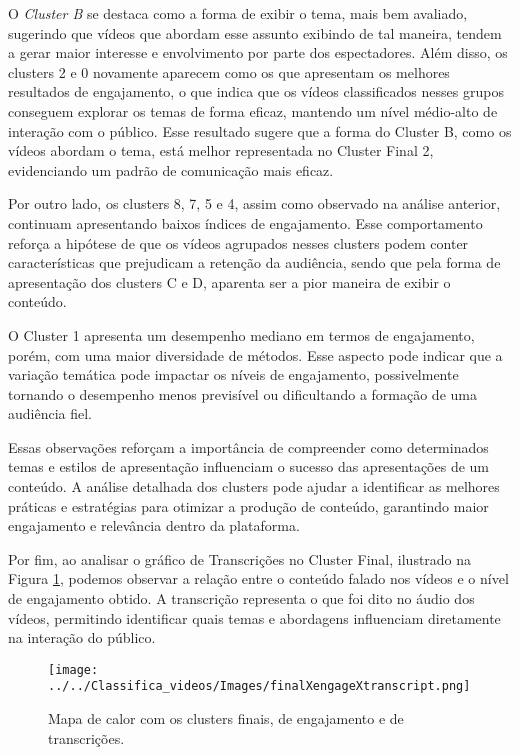 \documentclass[manuscript,screen,review]{acmart}
\begin{document}
O \textit{Cluster B} se destaca como a forma de exibir o tema, mais bem avaliado, sugerindo que vídeos que abordam esse assunto exibindo de tal maneira, tendem a gerar maior interesse e envolvimento por parte dos espectadores. Além disso, os clusters 2 e 0 novamente aparecem como os que apresentam os melhores resultados de engajamento, o que indica que os vídeos classificados nesses grupos conseguem explorar os temas de forma eficaz, mantendo um nível médio-alto de interação com o público. Esse resultado sugere que a forma do Cluster B, como os vídeos abordam o tema, está melhor representada no Cluster Final 2, evidenciando um padrão de comunicação mais eficaz.

Por outro lado, os clusters 8, 7, 5 e 4, assim como observado na análise anterior, continuam apresentando baixos índices de engajamento. Esse comportamento reforça a hipótese de que os vídeos agrupados nesses clusters podem conter características que prejudicam a retenção da audiência, sendo que pela forma de apresentação dos clusters C e D, aparenta ser a pior maneira de exibir o conteúdo.

O Cluster 1 apresenta um desempenho mediano em termos de engajamento, porém, com uma maior diversidade de métodos. Esse aspecto pode indicar que a variação temática pode impactar os níveis de engajamento, possivelmente tornando o desempenho menos previsível ou dificultando a formação de uma audiência fiel.

Essas observações reforçam a importância de compreender como determinados temas e estilos de apresentação influenciam o sucesso das apresentações de um conteúdo. A análise detalhada dos clusters pode ajudar a identificar as melhores práticas e estratégias para otimizar a produção de conteúdo, garantindo maior engajamento e relevância dentro da plataforma.

Por fim, ao analisar o gráfico de Transcrições no Cluster Final, ilustrado na Figura \ref{fig:transcriptFinal}, podemos observar a relação entre o conteúdo falado nos vídeos e o nível de engajamento obtido. A transcrição representa o que foi dito no áudio dos vídeos, permitindo identificar quais temas e abordagens influenciam diretamente na interação do público.

\begin{figure}
    \centering
    \texttt{[image: ../../Classifica\_videos/Images/finalXengageXtranscript.png]}
    \caption{Mapa de calor com os clusters finais, de engajamento e de transcrições.}
    \label{fig:transcriptFinal}
\end{figure}
\end{document}
